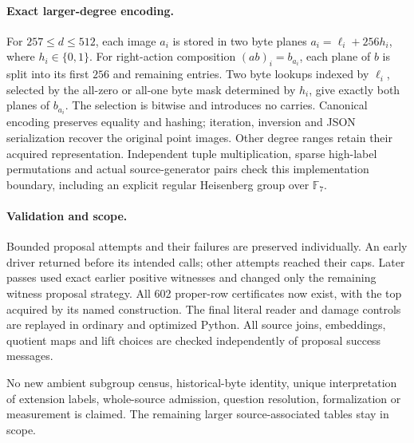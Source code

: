 \documentclass[11pt]{article}
\begin{document}
\paragraph{Exact larger-degree encoding.}
For $257\leq d\leq512$, each image $a_i$ is stored in two byte planes
$a_i=\ell_i+256h_i$, where $h_i\in\{0,1\}$. For right-action composition
$(ab)_i=b_{a_i}$, each plane of $b$ is split into its first $256$ and remaining
entries. Two byte lookups indexed by $\ell_i$, selected by the all-zero
or all-one byte mask determined by $h_i$, give exactly both planes of
$b_{a_i}$. The selection is bitwise and introduces no carries. Canonical
encoding preserves equality and hashing; iteration, inversion and JSON
serialization recover the original point images. Other degree ranges
retain their acquired representation. Independent tuple multiplication,
sparse high-label permutations and actual source-generator pairs check
this implementation boundary, including an explicit regular
Heisenberg group over $\mathbb F_7$.

\paragraph{Validation and scope.}
Bounded proposal attempts and their failures are preserved individually.
An early driver returned before its intended calls; other attempts reached
their caps. Later passes used exact earlier positive witnesses and changed
only the remaining witness proposal strategy. All 602 proper-row
certificates now exist, with the top acquired by its named construction.
The final literal reader and damage controls are replayed in ordinary and
optimized Python. All source joins, embeddings, quotient maps and lift
choices are checked independently of proposal success messages.

No new ambient subgroup census, historical-byte identity, unique
interpretation of extension labels, whole-source admission, question
resolution, formalization or measurement is claimed. The remaining larger
source-associated tables stay in scope.
\end{document}
